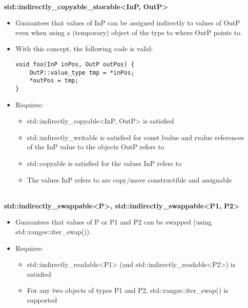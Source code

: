 \noindent
\hspace*{\fill} \\ %
\textbf{std::indirectly\_copyable\_storable<InP, OutP>}

\begin{itemize}
\item
Guarantees that values of InP can be assigned indirectly to values of OutP even when using a (temporary) object of the type to where OutP points to.

\item
With this concept, the following code is valid:

\begin{lstlisting}[style=styleCXX]
void foo(InP inPos, OutP outPos) {
	OutP::value_type tmp = *inPos;
	*outPos = tmp;
}
\end{lstlisting}

\item
Requires:
\begin{itemize}
\item
std::indirectly\_copyable<InP, OutP> is satisfied

\item
std::indirectly\_writable is satisfied for const lvalue and rvalue references of the InP value to the objects OutP refers to

\item
std::copyable is satisfied for the values InP refers to

\item
The values InP refers to are copy/move constructible and assignable
\end{itemize}
\end{itemize}

\noindent
\hspace*{\fill} \\ %
\textbf{std::indirectly\_swappable<P>, std::indirectly\_swappable<P1, P2>}

\begin{itemize}
\item
Guarantees that values of P or P1 and P2 can be swapped (using std::ranges::iter\_swap()).

\item
Requires:
\begin{itemize}
\item
std::indirectly\_readable<P1> (and std::indirectly\_readable<P2>) is satisfied

\item
For any two objects of types P1 and P2, std::ranges::iter\_swap() is supported
\end{itemize}
\end{itemize}

